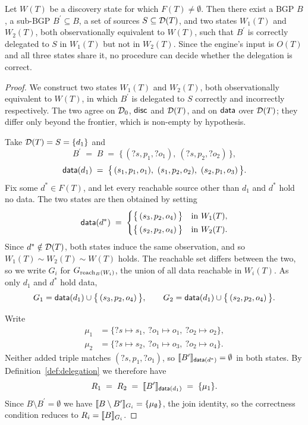 \begin{theorem}
  \label{th:undetermined}
  Let $W(T)$ be a discovery state for which $F(T) \neq \emptyset$. Then there exist a
  BGP $B$, a sub-BGP $B^{\prime} \subseteq B$, a set of sources
  $S \subseteq \mathcal{D}(T)$, and two states $W_1(T)$ and $W_2(T)$, both observationally
  equivalent to $W(T)$, such that $B^{\prime}$ is correctly delegated to $S$ in $W_1(T)$
  but not in $W_2(T)$. Since the engine's input is $O(T)$ and all three states share it,
  no procedure can decide whether the delegation is correct.
\end{theorem}

\begin{proof}
  We construct two states $W_1(T)$ and $W_2(T)$, both observationally equivalent to
  $W(T)$, in which $B^{\prime}$ is delegated to $S$ correctly and incorrectly
  respectively. The two agree on $\mathcal{D}_0$, $\mathsf{disc}$ and $\mathcal{D}(T)$, and on $\mathsf{data}$ over
  $\mathcal{D}(T)$; they differ only beyond the frontier, which is non-empty by hypothesis.

  Take $\mathcal{D}(T) = S = \{d_1\}$ and
  \[
    B^{\prime} \;=\; B \;=\; \bigl\{\, (?s, p_1, ?o_1),\ (?s, p_2, ?o_2) \,\bigr\},
  \]
  \[
    \mathsf{data}(d_1) \;=\; \bigl\{\, (s_1, p_1, o_1),\ (s_1, p_2, o_2),\ (s_2, p_1, o_3) \,\bigr\}.
  \]
  Fix some $d^{*} \in F(T)$, and let every reachable source other than $d_1$ and $d^{*}$
  hold no data. The two states are then obtained by setting
  \[
    \mathsf{data}(d^{*}) \;=\;
    \begin{cases}
      \bigl\{\, (s_3, p_2, o_4) \,\bigr\} & \text{in } W_1(T), \\[2pt]
      \bigl\{\, (s_2, p_2, o_4) \,\bigr\} & \text{in } W_2(T).
    \end{cases}
  \]
  Since $d^{*} \notin \mathcal{D}(T)$, both states induce the same observation, and so
  $W_1(T) \sim W_2(T) \sim W(T)$ holds. The reachable set differs between the two, so we
  write $G_i$ for $G_{\mathrm{reach}_B(W_i)}$, the union of all data reachable in $W_i(T)$. As
  only $d_1$ and $d^{*}$ hold data,
  \[
    G_1 = \mathsf{data}(d_1) \cup \bigl\{\, (s_3, p_2, o_4) \,\bigr\},
    \qquad
    G_2 = \mathsf{data}(d_1) \cup \bigl\{\, (s_2, p_2, o_4) \,\bigr\}.
  \]

  Write
  \begin{align*}
    \mu_1 &= \{?s \mapsto s_1,\ ?o_1 \mapsto o_1,\ ?o_2 \mapsto o_2\}, \\
    \mu_2 &= \{?s \mapsto s_2,\ ?o_1 \mapsto o_3,\ ?o_2 \mapsto o_4\}.
  \end{align*}
  Neither added triple matches $(?s, p_1, ?o_1)$, so
  $\llbracket B^{\prime} \rrbracket_{\mathsf{data}(d^{*})} = \emptyset$ in both states. By
  Definition~\ref{def:delegation} we therefore have
  \[
    R_1 \;=\; R_2 \;=\; \llbracket B^{\prime} \rrbracket_{\mathsf{data}(d_1)} \;=\; \{\mu_1\}.
  \]
  Since $B \setminus B^{\prime} = \emptyset$ we have
  $\llbracket B \setminus B^{\prime} \rrbracket_{G_i} = \{\mu_\emptyset\}$, the join identity, so the
  correctness condition reduces to $R_i = \llbracket B \rrbracket_{G_i}$.


\end{proof}
